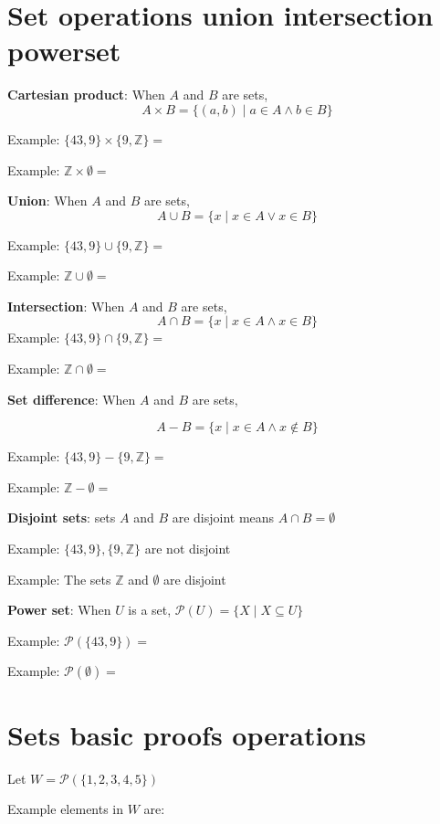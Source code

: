\documentclass[12pt, oneside]{article}
\begin{document}
\section*{Set operations union intersection powerset}


{\bf Cartesian product}: When $A$ and  $B$ are sets, 
\[
    A \times  B = \{ (a,b) \mid a \in A  \wedge b  \in B \}
\]

Example: $\{43, 9\} \times  \{9, \mathbb{Z}\}  = $
    
Example: $\mathbb{Z} \times \emptyset  = $

{\bf Union}: When $A$ and  $B$ are sets,
\[
    A \cup  B = \{ x \mid x \in A  \vee x \in B \}
\]    
    
Example: $\{43, 9\} \cup \{9, \mathbb{Z}\}  = $

Example: $\mathbb{Z} \cup \emptyset  = $ 

{\bf Intersection}: When $A$ and  $B$ are sets,
\[
    A \cap  B = \{ x \mid x \in A  \wedge x \in B \}
\]    
Example: $\{43, 9\} \cap \{9,\mathbb{Z}\}  = $

Example: $\mathbb{Z} \cap \emptyset  = $


{\bf Set  difference}: When $A$ and  $B$ are sets,

\[
    A -  B = \{ x \mid x \in A  \wedge x \notin B \}
\]

Example: $\{43, 9\} - \{9, \mathbb{Z}\}  = $

Example: $\mathbb{Z} - \emptyset  = $

    
{\bf Disjoint sets}: sets $A$ and  $B$ are disjoint means $A \cap  B  = \emptyset$

Example: $\{43, 9\}, \{9, \mathbb{Z}\}$ are not  disjoint 

Example: The sets $\mathbb{Z}$ and $\emptyset$ are disjoint

    

{\bf Power set}: When $U$ is a set, $\mathcal{P}(U) = \{ X \mid X \subseteq U\}$

Example: $\mathcal{P}(\{43, 9\}) = $

Example: $\mathcal{P}(\emptyset) = $
 \vfill
\section*{Sets basic proofs operations}


Let $W =  \mathcal{P}(  \{ 1,2,3,4,5\} )$

Example elements in $W$ are:
\vspace{20pt}
\end{document}
